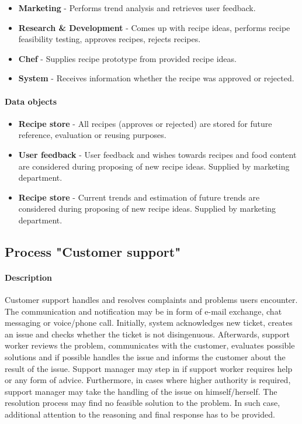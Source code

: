 \documentclass[11pt,a4paper]{article}
\begin{document}
\begin{itemize}
    \item \textbf{Marketing} - Performs trend analysis and retrieves user feedback.
    \item \textbf{Research \& Development} - Comes up with recipe ideas, performs recipe feasibility testing, approves recipes, rejects recipes.
    \item \textbf{Chef} - Supplies recipe prototype from provided recipe ideas.
    \item \textbf{System} - Receives information whether the recipe was approved or rejected.
\end{itemize}

\paragraph{Data objects}

\begin{itemize}
    \item \textbf{Recipe store} - All recipes (approves or rejected) are stored for future reference, evaluation or reusing purposes.
    \item \textbf{User feedback} - User feedback and wishes towards recipes and food content are considered during proposing of new recipe ideas. Supplied by marketing department.
    \item \textbf{Recipe store} - Current trends and estimation of future trends are considered during proposing of new recipe ideas. Supplied by marketing department.
\end{itemize}

\newpage




\subsection{Process "Customer support"}

\paragraph{Description}
Customer support handles and resolves complaints and problems users encounter. The communication and notification may be in form of e-mail exchange, chat messaging or voice/phone call. Initially, system acknowledges new ticket, creates an issue and checks whether the ticket is not disingenuous. Afterwards, support worker reviews the problem, communicates with the customer, evaluates possible solutions and if possible handles the issue and informs the customer about the result of the issue. Support manager may step in if support worker requires help or any form of advice. Furthermore, in cases where higher authority is required, support manager may take the handling of the issue on himself/herself. The resolution process may find no feasible solution to the problem. In such case, additional attention to the reasoning and final response has to be provided.
\end{document}
